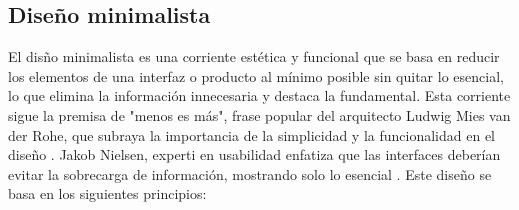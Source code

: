 \documentclass[twoside, openright, 11pt]{report}
\begin{document}
		\subsection{Diseño minimalista}
		El disño minimalista es una corriente estética y funcional que se basa en reducir los elementos de una interfaz o producto al mínimo posible sin quitar lo esencial, lo que elimina la información innecesaria y destaca la fundamental. Esta corriente sigue la premisa de "menos es más", frase popular del arquitecto Ludwig Mies van der Rohe, que subraya la importancia de la simplicidad y la funcionalidad en el diseño \cite{wikipediaLessIsMore}. Jakob Nielsen, experti en usabilidad enfatiza que las interfaces deberían evitar la sobrecarga de información, mostrando solo lo esencial \cite{nielsen1994}. Este diseño se basa en los siguientes principios:
\end{document}
